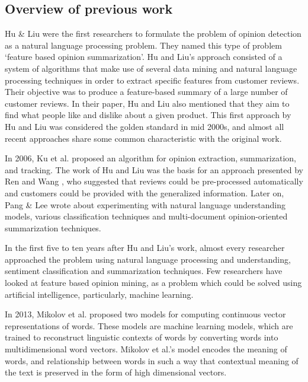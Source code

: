 \documentclass{sig-alternate}
\begin{document}
\subsection{Overview of previous work}
Hu \& Liu\cite{HuLiu2004} were the first researchers to formulate the problem of opinion detection as a natural language processing problem. They named this type of problem `feature based opinion summarization'. Hu and Liu's approach consisted of a system of algorithms that make use of several data mining and natural language processing techniques in order to extract specific features from customer reviews. Their objective was to produce a feature-based summary of a large number of customer reviews. In their paper, Hu and Liu also mentioned that they aim to find what people like and dislike about a given product. This first approach by Hu and Liu was considered the golden standard in mid 2000s, and almost all recent approaches share some common characteristic with the original work. 

In 2006, Ku et al.\cite{KuLiangChen2006} proposed an algorithm for opinion extraction, summarization, and tracking. The work of Hu and Liu was the basis for an approach presented by Ren and Wang \cite{RenWang}, who suggested that reviews could be pre-processed automatically and customers could be provided with the generalized information. Later on, Pang \& Lee\cite{PangLee2008} wrote about experimenting with natural language understanding models, various classification techniques and multi-document opinion-oriented summarization techniques. 

In the first five to ten years after Hu and Liu\cite{HuLiu2004}'s work, almost every researcher approached the problem using natural language processing and understanding, sentiment classification and summarization techniques. Few researchers have looked at feature based opinion mining, as a problem which could be solved using artificial intelligence, particularly, machine learning.

In 2013, Mikolov et al.\cite{MikolovChenCorradoDean2013b} proposed two models for computing continuous vector representations of words. These models are machine learning models, which are trained to reconstruct linguistic contexts of words by converting words into multidimensional word vectors. Mikolov et al.\cite{MikolovChenCorradoDean2013a}'s model encodes the meaning of words, and relationship between words in such a way that contextual meaning of the text is preserved in the form of high dimensional vectors.
\end{document}

